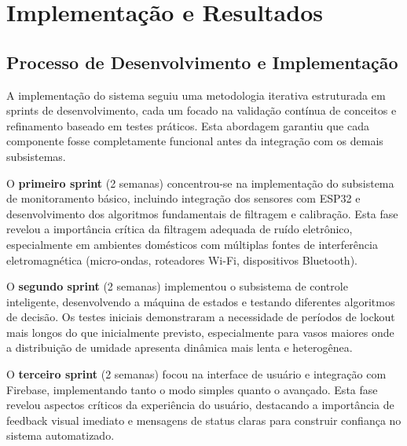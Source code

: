 
\chapter{Implementação e Resultados}

\section{Processo de Desenvolvimento e Implementação}

A implementação do sistema seguiu uma metodologia iterativa estruturada em sprints de desenvolvimento, cada um focado na validação contínua de conceitos e refinamento baseado em testes práticos. Esta abordagem garantiu que cada componente fosse completamente funcional antes da integração com os demais subsistemas.

O \textbf{primeiro sprint} (2 semanas) concentrou-se na implementação do subsistema de monitoramento básico, incluindo integração dos sensores com ESP32 e desenvolvimento dos algoritmos fundamentais de filtragem e calibração. Esta fase revelou a importância crítica da filtragem adequada de ruído eletrônico, especialmente em ambientes domésticos com múltiplas fontes de interferência eletromagnética (micro-ondas, roteadores Wi-Fi, dispositivos Bluetooth).

O \textbf{segundo sprint} (2 semanas) implementou o subsistema de controle inteligente, desenvolvendo a máquina de estados e testando diferentes algoritmos de decisão. Os testes iniciais demonstraram a necessidade de períodos de lockout mais longos do que inicialmente previsto, especialmente para vasos maiores onde a distribuição de umidade apresenta dinâmica mais lenta e heterogênea.

O \textbf{terceiro sprint} (2 semanas) focou na interface de usuário e integração com Firebase, implementando tanto o modo simples quanto o avançado. Esta fase revelou aspectos críticos da experiência do usuário, destacando a importância de feedback visual imediato e mensagens de status claras para construir confiança no sistema automatizado.

